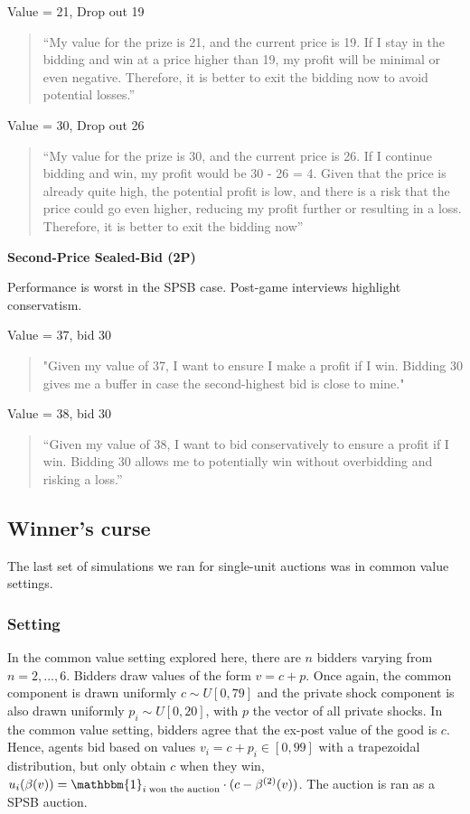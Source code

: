 \documentclass{article} %
\begin{document}
Value = 21,  Drop out 19
\begin{quote}
    “My value for the prize is 21, and the current price is 19. If I stay in the bidding and win at a price higher than 19, my profit will be minimal or even negative. Therefore, it is better to exit the bidding now to avoid potential losses.”
\end{quote}

Value = 30,  Drop out 26
\begin{quote}
“My value for the prize is 30, and the current price is 26. If I continue bidding and win, my profit would be 30 - 26 = 4. Given that the price is already quite high, the potential profit is low, and there is a risk that the price could go even higher, reducing my profit further or resulting in a loss. Therefore, it is better to exit the bidding now”
\end{quote}


\textbf{Second-Price Sealed-Bid (2P)}

Performance is worst in the SPSB case. 
Post-game interviews highlight conservatism.

Value = 37, bid 30
\begin{quote}
    "Given my value of 37, I want to ensure I make a profit if I win. Bidding 30 gives me a buffer in case the second-highest bid is close to mine."
\end{quote}

Value = 38, bid 30
\begin{quote}
    “Given my value of 38, I want to bid conservatively to ensure a profit if I win. Bidding 30 allows me to potentially win without overbidding and risking a loss.”
\end{quote}







\subsection{Winner's curse}\label{session:winner}
The last set of simulations we ran for single-unit auctions was in common value settings. 

\subsubsection{Setting}
In the common value setting explored here, there are $n$ bidders varying from $n = 2, ..., 6$. 
Bidders draw values of the form $v = c + p$. Once again, the common component is drawn uniformly $c \sim U[0, 79]$ and the private shock component is also drawn uniformly $p_i \sim U[0, 20]$, with $p$ the vector of all private shocks. 
In the common value setting, bidders agree that the ex-post value of the good is $c$. 
Hence, agents bid based on values $v_i = c + p_i \in [0, 99]$ with a trapezoidal distribution, but only obtain $c$ when they win, $u_i(\beta(v)) = \mathbbm{1}_{i \; \text{won the auction}} \cdot (c - \beta^{(2)}(v))$. 
The auction is ran as a SPSB auction. 
\end{document}
